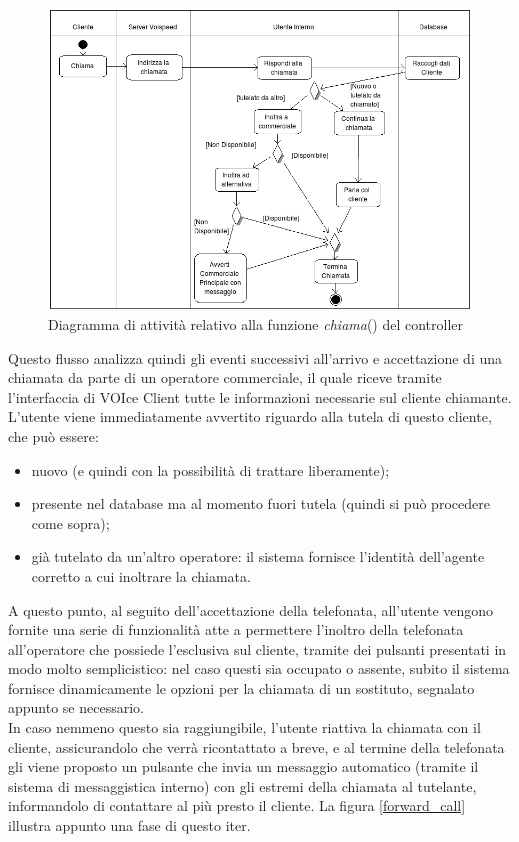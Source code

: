 \begin{figure}[!ht]
\centering
  \includegraphics[scale=0.7]{./images/chiamataAct.png}
\caption{Diagramma di attivit\`a relativo alla funzione \textit{chiama}() del controller}
\label{act_call}
\end{figure}

\noindent
Questo flusso analizza quindi gli eventi successivi all'arrivo e accettazione di una chiamata da parte di un operatore commerciale, il quale riceve tramite l'interfaccia di VOIce Client tutte le informazioni necessarie sul cliente chiamante. L'utente viene immediatamente avvertito riguardo alla tutela di questo cliente, che pu\`o essere:
\begin{itemize}
 \item nuovo (e quindi con la possibilit\`a di trattare liberamente);
 \item presente nel database ma al momento fuori tutela (quindi si pu\`o procedere come sopra);
 \item gi\`a tutelato da un'altro operatore: il sistema fornisce l'identit\`a dell'agente corretto a cui inoltrare la chiamata.
\end{itemize}
\noindent
A questo punto, al seguito dell'accettazione della telefonata, all'utente vengono fornite una serie di funzionalit\`a atte a permettere l'inoltro della telefonata all'operatore che possiede l'esclusiva sul cliente, tramite dei pulsanti presentati in modo molto semplicistico: nel caso questi sia occupato o assente, subito il sistema fornisce dinamicamente le opzioni per la chiamata di un sostituto, segnalato appunto se necessario. \\
In caso nemmeno questo sia raggiungibile, l'utente riattiva la chiamata con il cliente, assicurandolo che verr\`a ricontattato a breve, e al termine della telefonata gli viene proposto un pulsante che invia un messaggio automatico (tramite il sistema di messaggistica interno) con gli estremi della chiamata al tutelante, informandolo di contattare al pi\`u presto il cliente. La figura \ref{forward_call} illustra appunto una fase di questo iter. 

